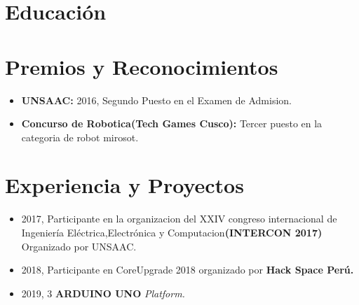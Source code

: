 \documentclass[11pt,a4paper,sans]{moderncv}        %
\begin{document}
\makecvtitle
\section{Educaci\'on}

\section{Premios y Reconocimientos}
\begin{itemize}
\item{\textbf{UNSAAC: } 2016, Segundo Puesto en el Examen de Admision.}
\item{\textbf{Concurso de Robotica(Tech Games Cusco): } Tercer puesto en la categoria de robot mirosot.}
\end{itemize}
\section{Experiencia y Proyectos}
\begin{itemize}
\item{2017, Participante en la organizacion del XXIV congreso internacional de Ingenier\'ia El\'ectrica,Electr\'onica y Computacion}\textbf{(INTERCON 2017)}{ Organizado por UNSAAC.} 
\item{2018, Participante en CoreUpgrade 2018 organizado por }\textbf{Hack Space Perú.} 
\item{2019, 3 }\textbf{ARDUINO UNO }\textit{Platform.} 
\end{itemize}
\end{document}
